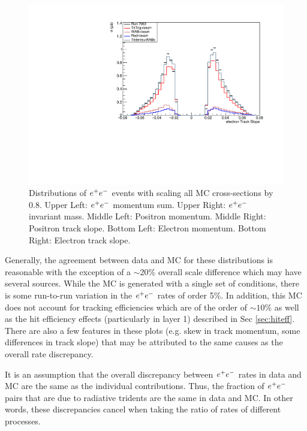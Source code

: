 \begin{figure}[tbhp]
      \includegraphics[scale=0.35]{figs/recon/xs-norm-data-EpEmTB-p2slope-intruns-NoESumCut_pre-vertex-intplots.pdf}
    \caption{Distributions of $e^{+}e^{-}$ events with scaling all MC cross-sections by 0.8. Upper Left: $e^{+}e^{-}$ momentum sum. Upper Right: $e^{+}e^{-}$ invariant mass. Middle Left: Positron momentum. Middle Right: Positron track slope. Bottom Left: Electron momentum. Bottom Right: Electron track slope.
    }
   \label{fig:epem_noESumCut_AllScale}
\end{figure}  
Generally, the agreement between data and MC for these distributions is reasonable with the exception of a $\sim$20\% overall scale difference which may have several sources.  While the MC is generated with a single set of conditions, there is some run-to-run variation in the $e^{+}e^{-}$ rates of order 5\%. In addition, this MC does not account for tracking efficiencies which are of the order of $\sim 10\%$ as well as the hit efficiency effects (particularly in layer 1) described in Sec \ref{sec:hiteff}. There are also a few features in these plots (e.g. skew in track momentum, some differences in track slope) that may be attributed to the same causes as the overall rate discrepancy.

It is an assumption that the overall discrepancy between $e^{+}e^{-}$ rates in data and MC are the same as the individual contributions. Thus, the fraction of $e^{+}e^{-}$ pairs that are due to radiative tridents are the same in data and MC. In other words, these discrepancies cancel when taking the ratio of rates of different processes.

